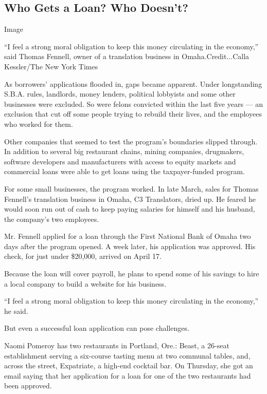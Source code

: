 \hypertarget{who-gets-a-loan-who-doesnt}{%
\subsection{Who Gets a Loan? Who
Doesn't?}\label{who-gets-a-loan-who-doesnt}}

Image

``I feel a strong moral obligation to keep this money circulating in the
economy,'' said Thomas Fennell, owner of a translation business in
Omaha.Credit...Calla Kessler/The New York Times

As borrowers' applications flooded in, gaps became apparent. Under
longstanding S.B.A. rules, landlords, money lenders, political lobbyists
and some other businesses were excluded. So were felons convicted within
the last five years --- an exclusion that cut off some people trying to
rebuild their lives, and the employees who worked for them.

Other companies that seemed to test the program's boundaries slipped
through. In addition to several big restaurant chains, mining companies,
drugmakers, software developers and manufacturers with access to equity
markets and commercial loans were able to get loans using the
taxpayer-funded program.

For some small businesses, the program worked. In late March, sales for
Thomas Fennell's translation business in Omaha, C3 Translators, dried
up. He feared he would soon run out of cash to keep paying salaries for
himself and his husband, the company's two employees.

Mr. Fennell applied for a loan through the First National Bank of Omaha
two days after the program opened. A week later, his application was
approved. His check, for just under \$20,000, arrived on April 17.

Because the loan will cover payroll, he plans to spend some of his
savings to hire a local company to build a website for his business.

``I feel a strong moral obligation to keep this money circulating in the
economy,'' he said.

But even a successful loan application can pose challenges.

Naomi Pomeroy has two restaurants in Portland, Ore.: Beast, a 26-seat
establishment serving a six-course tasting menu at two communal tables,
and, across the street, Expatriate, a high-end cocktail bar. On
Thursday, she got an email saying that her application for a loan for
one of the two restaurants had been approved.

